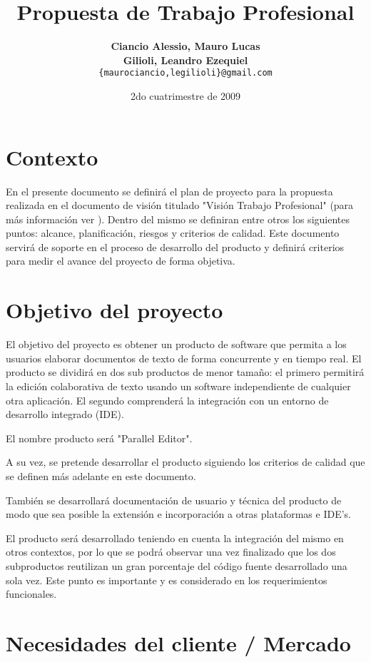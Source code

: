 \documentclass[12pt,a4paper]{article}
\title { \textbf{Propuesta de Trabajo Profesional}}
\date{2do cuatrimestre de 2009}
\author{\textbf{Ciancio Alessio, Mauro Lucas} \\
		\textbf{Gilioli, Leandro Ezequiel}	  \\
		\texttt{\{maurociancio,legilioli\}@gmail.com}
	}
\begin{document}
\maketitle
\tableofcontents
\newpage

	\section{Contexto}

	En el presente documento se definirá el plan de proyecto para la propuesta realizada en el documento de visión titulado "Visión Trabajo Profesional" (para más información ver \cite{visiontpprof}). 
	Dentro del mismo se definiran entre otros los siguientes puntos: alcance, planificación, riesgos y criterios de calidad. 
	Este documento servirá de soporte en el proceso de desarrollo del producto y definirá criterios para medir el avance del proyecto de forma objetiva.	
		
	\section{Objetivo del proyecto}

El objetivo del proyecto es obtener un producto de software que permita a los usuarios elaborar documentos de texto de forma concurrente y en tiempo real. El producto se dividirá en dos sub productos de menor tamaño: el primero permitirá la edición colaborativa de texto usando un software independiente de cualquier otra aplicación. El segundo comprenderá la integración con un entorno de desarrollo integrado (IDE).

El nombre producto será "Parallel Editor".

A su vez, se pretende desarrollar el producto siguiendo los criterios de calidad que se definen más adelante en este documento.

También se desarrollará documentación de usuario y técnica del producto de modo que sea posible la extensión e incorporación a otras plataformas e IDE's.

El producto será desarrollado teniendo en cuenta la integración del mismo en otros contextos, por lo que se podrá observar una vez finalizado que los dos subproductos reutilizan un gran porcentaje del código fuente desarrollado una sola vez. Este punto es importante y es considerado en los requerimientos funcionales.	
	
	\section{Necesidades del cliente / Mercado}
	
\end{document}
